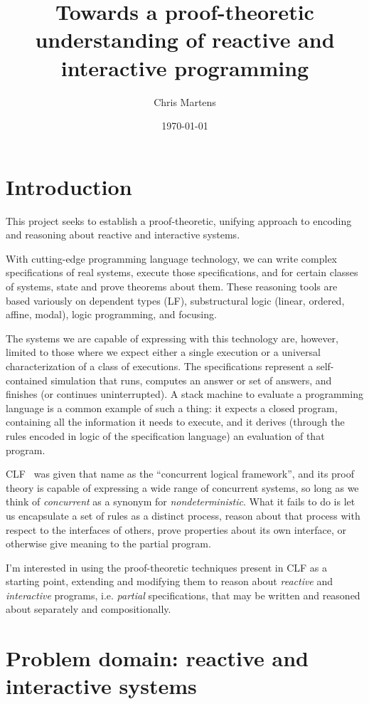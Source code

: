 \documentclass{article}
\title{Towards a proof-theoretic understanding of reactive and interactive
programming}
\author{Chris Martens}
\date{\today}
\begin{document}
\maketitle

\section{Introduction}

This project seeks to establish a proof-theoretic, unifying approach to
encoding and reasoning about reactive and interactive systems.

With cutting-edge programming language technology, we can write complex
specifications of real systems, execute those specifications, and for
certain classes of systems, state and prove theorems about them. These
reasoning tools are based variously on dependent types (LF), substructural
logic (linear, ordered, affine, modal), logic programming,
and focusing.

The systems we are capable of expressing with this technology are, however,
limited to those where we expect either a single execution or a universal
characterization of a class of executions. The specifications represent a
self-contained simulation that runs, computes an answer or set of answers,
and finishes (or continues uninterrupted). A stack machine to evaluate
a programming language is a common example of such a thing: it expects a
closed program, containing all the information it needs to execute, and it
derives (through the rules encoded in logic of the specification language)
an evaluation of that program.

CLF~\cite{CLF} was given that name as the ``concurrent logical framework'', and
its proof theory is capable of expressing a wide range of concurrent
systems, so long as we think of {\em concurrent} as a synonym for {\em
nondeterministic}. What it fails to do is let us encapsulate a set of rules
as a distinct process, reason about that process with respect to the
interfaces of others, prove properties about its own interface, or
otherwise give meaning to the partial program.

I'm interested in using the proof-theoretic techniques present in CLF as a
starting point, extending and modifying them to reason about {\em reactive}
and {\em interactive} programs, i.e. {\em partial} specifications, that may
be written and reasoned about separately and compositionally.


\section{Problem domain: reactive and interactive systems}
\end{document}
